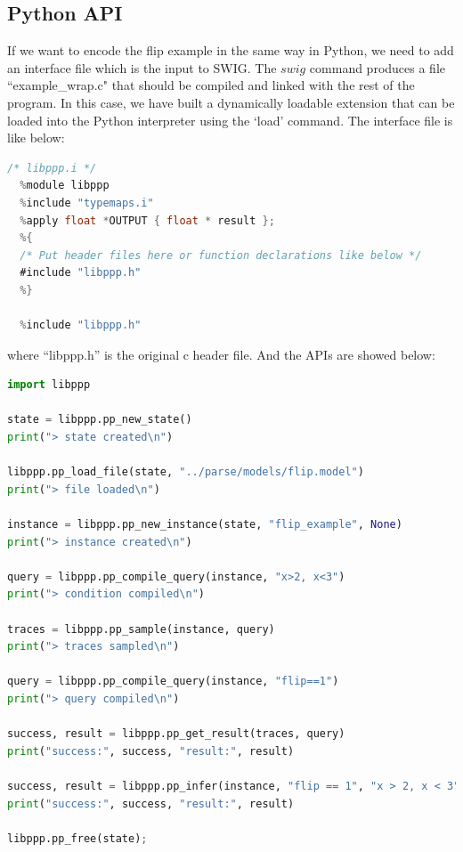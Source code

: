 \subsection{Python API}
If we want to encode the flip example in the same way in Python, we need to add an interface file which is the input to SWIG. The $swig$ command produces a file ``example\_wrap.c" that should be compiled and linked with the rest of the program. In this case, we have built a dynamically loadable extension that can be loaded into the Python interpreter using the `load' command. The interface file is like below:
\begin{lstlisting}[language=C]
  /* libppp.i */
  %module libppp
  %include "typemaps.i"
  %apply float *OUTPUT { float * result };
  %{
  /* Put header files here or function declarations like below */
  #include "libppp.h"
  %}

  %include "libppp.h"
\end{lstlisting}
where ``libppp.h'' is the original c header file.
And the APIs are showed below:
\begin{lstlisting}[language=Python]
import libppp

state = libppp.pp_new_state()
print("> state created\n")

libppp.pp_load_file(state, "../parse/models/flip.model")
print("> file loaded\n")

instance = libppp.pp_new_instance(state, "flip_example", None)
print("> instance created\n")

query = libppp.pp_compile_query(instance, "x>2, x<3")
print("> condition compiled\n")

traces = libppp.pp_sample(instance, query)
print("> traces sampled\n")

query = libppp.pp_compile_query(instance, "flip==1")
print("> query compiled\n")

success, result = libppp.pp_get_result(traces, query)
print("success:", success, "result:", result)

success, result = libppp.pp_infer(instance, "flip == 1", "x > 2, x < 3")
print("success:", success, "result:", result)

libppp.pp_free(state); 
\end{lstlisting}

